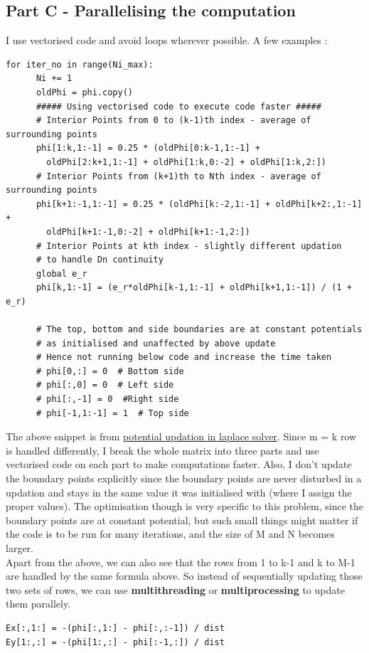 \documentclass[11pt, a4paper]{article}
\begin{document}
\subsection{Part C - Parallelising the computation}
I use vectorised code and avoid loops wherever possible. A few examples :
\begin{verbatim}
for iter_no in range(Ni_max):
      Ni += 1
      oldPhi = phi.copy()
      ##### Using vectorised code to execute code faster #####
      # Interior Points from 0 to (k-1)th index - average of surrounding points
      phi[1:k,1:-1] = 0.25 * (oldPhi[0:k-1,1:-1] + 
        oldPhi[2:k+1,1:-1] + oldPhi[1:k,0:-2] + oldPhi[1:k,2:])
      # Interior Points from (k+1)th to Nth index - average of surrounding points
      phi[k+1:-1,1:-1] = 0.25 * (oldPhi[k:-2,1:-1] + oldPhi[k+2:,1:-1] +
        oldPhi[k+1:-1,0:-2] + oldPhi[k+1:-1,2:])
      # Interior Points at kth index - slightly different updation 
      # to handle Dn continuity
      global e_r
      phi[k,1:-1] = (e_r*oldPhi[k-1,1:-1] + oldPhi[k+1,1:-1]) / (1 + e_r)

      # The top, bottom and side boundaries are at constant potentials
      # as initialised and unaffected by above update
      # Hence not running below code and increase the time taken
      # phi[0,:] = 0  # Bottom side
      # phi[:,0] = 0  # Left side
      # phi[:,-1] = 0  #Right side
      # phi[-1,1:-1] = 1  # Top side
\end{verbatim}
The above snippet is from \hyperref[lst:laplace_solver]{potential updation in laplace solver}. Since m = k row is handled differently,
I break the whole matrix into three parts and use vectorised code on each part to make computations faster. Also, I don't update the boundary points explicitly 
since the boundary points are never disturbed in a updation and stays in the same value it was initialised with (where I assign the proper values).
The optimisation though is very specific to this problem, since the boundary points are at constant potential, but such small things might matter 
if the code is to be run for many iterations, and the size of M and N becomes larger.
\\
Apart from the above, we can also see that the rows from 1 to k-1 and k to M-1 are handled by the same formula above.
So instead of sequentially updating those two sets of rows, we can use \textbf{multithreading} or \textbf{multiprocessing} to update them parallely.
\\
\begin{verbatim}
Ex[:,1:] = -(phi[:,1:] - phi[:,:-1]) / dist
Ey[1:,:] = -(phi[1:,:] - phi[:-1,:]) / dist
\end{verbatim}
\end{document}
